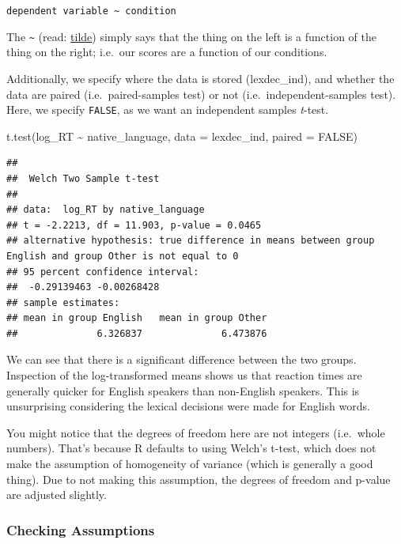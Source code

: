 \documentclass[
]{book}
\newenvironment{Shaded}{\begin{snugshade}}{\end{snugshade}}
\newcommand{\AttributeTok}[1]{\textcolor[rgb]{0.77,0.63,0.00}{#1}}
\newcommand{\ConstantTok}[1]{\textcolor[rgb]{0.00,0.00,0.00}{#1}}
\newcommand{\FunctionTok}[1]{\textcolor[rgb]{0.00,0.00,0.00}{#1}}
\newcommand{\NormalTok}[1]{#1}
\newcommand{\SpecialCharTok}[1]{\textcolor[rgb]{0.00,0.00,0.00}{#1}}
\begin{document}
\texttt{dependent\ variable\ \textasciitilde{}\ condition}

The \texttt{\textasciitilde{}} (read: \href{https://www.youtube.com/watch?v=InPByzCDoA4}{tilde}) simply says that the thing on the left is a function of the thing on the right; i.e.~our scores are a function of our conditions.

Additionally, we specify where the data is stored (lexdec\_ind), and whether the data are paired (i.e.~paired-samples test) or not (i.e.~independent-samples test). Here, we specify \texttt{FALSE}, as we want an independent samples \emph{t}-test.

\begin{Shaded}
\begin{Highlighting}[]
\FunctionTok{t.test}\NormalTok{(log\_RT }\SpecialCharTok{\textasciitilde{}}\NormalTok{ native\_language, }\AttributeTok{data =}\NormalTok{ lexdec\_ind, }\AttributeTok{paired =} \ConstantTok{FALSE}\NormalTok{)}
\end{Highlighting}
\end{Shaded}

\begin{verbatim}
## 
##  Welch Two Sample t-test
## 
## data:  log_RT by native_language
## t = -2.2213, df = 11.903, p-value = 0.0465
## alternative hypothesis: true difference in means between group English and group Other is not equal to 0
## 95 percent confidence interval:
##  -0.29139463 -0.00268428
## sample estimates:
## mean in group English   mean in group Other 
##              6.326837              6.473876
\end{verbatim}

We can see that there is a significant difference between the two groups. Inspection of the log-transformed means shows us that reaction times are generally quicker for English speakers than non-English speakers. This is unsurprising considering the lexical decisions were made for English words.

You might notice that the degrees of freedom here are not integers (i.e.~whole numbers). That's because R defaults to using Welch's t-test, which does not make the assumption of homogeneity of variance (which is generally a good thing). Due to not making this assumption, the degrees of freedom and p-value are adjusted slightly.

\hypertarget{checking-assumptions-1}{%
\subsubsection{Checking Assumptions}\label{checking-assumptions-1}}
\end{document}
